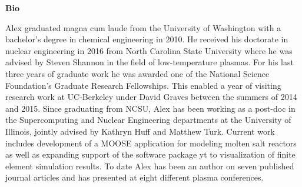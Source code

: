 \documentclass[12pt]{article}
\begin{document}
\textbf{Bio}

Alex graduated magna cum laude from the University of Washington with a
bachelor's degree in chemical engineering in 2010. He received his doctorate in
nuclear engineering in 2016 from North Carolina State University where he was
advised by Steven Shannon in the field of low-temperature plasmas. For his last
three years of graduate work he was awarded one of the National Science Foundation's
Graduate Research Fellowships. This enabled a year of visiting research work at
UC-Berkeley under David Graves between the summers of 2014 and 2015. Since
graduating from NCSU, Alex has been working as a post-doc in the Supercomputing
and Nuclear Engineering departments at the University of Illinois, jointly
advised by Kathryn Huff and Matthew Turk. Current work includes development of a
MOOSE application for modeling molten salt reactors as well as expanding support
of the software package yt to visualization of finite element simulation
results. To date Alex has been an author on seven published journal articles and
has presented at eight different plasma conferences.
\end{document}
